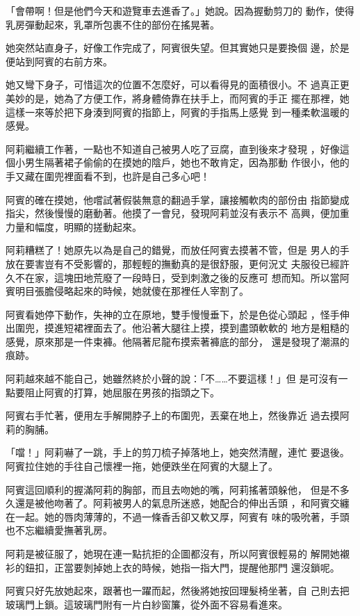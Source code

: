 「會帶啊！但是他們今天和遊覽車去進香了。」她說。因為握動剪刀的
動作，使得乳房彈動起來，乳罩所包裹不住的部份在搖晃著。

她突然站直身子，好像工作完成了，阿賓很失望。但其實她只是要換個
邊，於是便站到阿賓的右前方來。

她又彎下身子，可惜這次的位置不怎麼好，可以看得見的面積很小。不
過真正更美妙的是，她為了方便工作，將身體倚靠在扶手上，而阿賓的手正
擺在那裡，她這樣一來等於把下身湊到阿賓的指節上，阿賓的手指馬上感覺
到一種柔軟溫暖的感覺。

阿莉繼續工作著，一點也不知道自己被男人吃了豆腐，直到後來才發現
，好像這個小男生隔著裙子偷偷的在摸她的陰戶，她也不敢肯定，因為那動
作很小，他的手又藏在圍兜裡面看不到，也許是自己多心吧！

阿賓的確在摸她，他嚐試著假裝無意的翻過手掌，讓接觸軟肉的部份由
指節變成指尖，然後慢慢的磨動著。他摸了一會兒，發現阿莉並沒有表示不
高興，便加重力量和幅度，明顯的搓動起來。

阿莉糟糕了！她原先以為是自己的錯覺，而放任阿賓去摸著不管，但是
男人的手放在要害豈有不受影響的，那輕輕的撫動真的是很舒服，更何況丈
夫服役已經許久不在家，這塊田地荒廢了一段時日，受到刺激之後的反應可
想而知。所以當阿賓明目張膽侵略起來的時候，她就傻在那裡任人宰割了。

阿賓看她停下動作，失神的立在原地，雙手慢慢垂下，於是色從心頭起
，怪手伸出圍兜，摸進短裙裡面去了。他沿著大腿往上摸，摸到盡頭軟軟的
地方是粗糙的感覺，原來那是一件束褲。他隔著尼龍布摸索著褲底的部分，
還是發現了潮濕的痕跡。

阿莉越來越不能自己，她雖然終於小聲的說：「不……不要這樣！」但
是可沒有一點要阻止阿賓的打算，她屈服在男孩的指頭之下。

阿賓右手忙著，便用左手解開脖子上的布圍兜，丟棄在地上，然後靠近
過去摸阿莉的胸脯。

「噹！」阿莉嚇了一跳，手上的剪刀梳子掉落地上，她突然清醒，連忙
要退後。阿賓拉住她的手往自己懷裡一拖，她便跌坐在阿賓的大腿上了。

阿賓這回順利的握滿阿莉的胸部，而且去吻她的嘴，阿莉搖著頭躲他，
但是不多久還是被他吻著了。阿莉被男人的氣息所迷惑，她配合的伸出舌頭
，和阿賓交纏在一起。她的唇肉薄薄的，不過一條香舌卻又軟又厚，阿賓有
味的吸吮著，手頭也不忘繼續愛撫著乳房。

阿莉是被征服了，她現在連一點抗拒的企圖都沒有，所以阿賓很輕易的
解開她襯衫的鈕扣，正當要剝掉她上衣的時候，她指一指大門，提醒他那門
還沒鎖呢。

阿賓只好先放她起來，跟著也一躍而起，然後將她按回理髮椅坐著，自
己則去把玻璃門上鎖。這玻璃門附有一片白紗窗簾，從外面不容易看進來。

